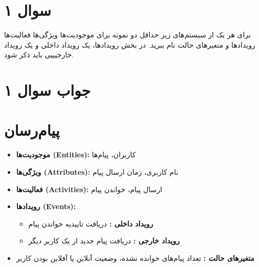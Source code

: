 \section*{سوال ۱}

برای هر یک از سیستم‌های زیر حداقل دو نمونه برای موجودیت‌ها 
ویژگی‌ها 
فعالیت‌ها 
رویدادها 
و متغیرهای حالت 
نام ببرید. در بخش رویدادها، یک رویداد داخلی 
و یک رویداد خارجیییی 
باید ذکر شود.

\section*{جواب سوال ۱}

\section*{پیام‌رسان}
\begin{itemize}
	\item \textbf{موجودیت‌ها (Entities):} کاربران، پیام‌ها
	\item \textbf{ویژگی‌ها (Attributes):} نام کاربری، زمان ارسال پیام
	\item \textbf{فعالیت‌ها (Activities):} ارسال پیام، خواندن پیام
	\item \textbf{رویدادها (Events):} 
	\begin{itemize}
		\item \textbf{رویداد داخلی :} دریافت تاییدیه خواندن پیام
		\item \textbf{رویداد خارجی :} دریافت پیام جدید از یک کاربر دیگر
	\end{itemize}
	\item \textbf{متغیرهای حالت :} تعداد پیام‌های خوانده نشده، وضعیت آنلاین یا آفلاین بودن کاربر
\end{itemize}


